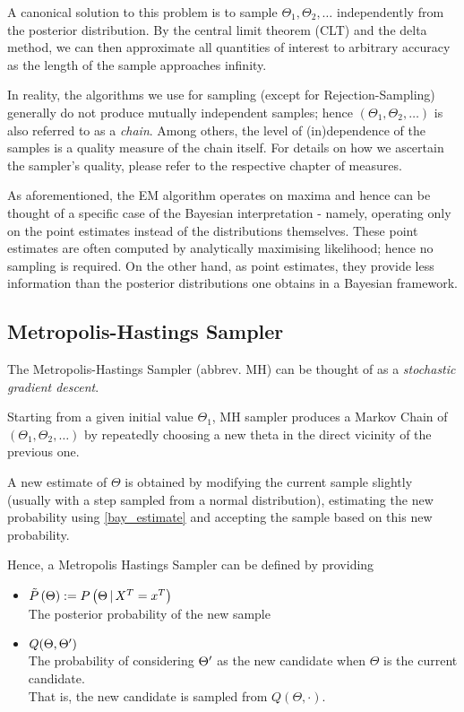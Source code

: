 	A canonical solution to this problem is to sample $\Theta_1, \Theta_2, \dots$ independently from the posterior distribution. By the central limit theorem (CLT) and the delta method, we can then approximate all quantities of interest to arbitrary accuracy as the length of the sample approaches infinity. 
	
	In reality, the algorithms we use for sampling (except for Rejection-Sampling) generally do not produce mutually independent samples; hence $\left(\Theta_1, \Theta_2, \dots \right)$ is also referred to as a \textit{chain}. Among others, the level of (in)dependence of the samples is a quality measure of the chain itself. For details on how we ascertain the sampler's quality, please refer to the respective chapter of measures.   
	
	
	As aforementioned, the EM algorithm operates on maxima and hence can be thought of a specific case of the Bayesian interpretation - namely, operating only on the point estimates instead of the distributions themselves. These point estimates are often computed by analytically maximising likelihood; hence no sampling is required. On the other hand, as point estimates, they provide less information than the posterior distributions one obtains in a Bayesian framework. 
	
	

	\subsection{Metropolis-Hastings Sampler}
	\label{chap_mh_sampler}
	The Metropolis-Hastings Sampler (abbrev. MH) can be thought of as a \textit{stochastic gradient descent}. 
	
	Starting from a given initial value $\Theta_1$,  MH sampler produces a Markov Chain of $\left(\Theta_1, \Theta_2, \dots \right)$ by repeatedly choosing a new theta in the direct vicinity of the previous one. 
	
	A new estimate of $\Theta$ is obtained by modifying the current sample slightly (usually with a step sampled from a normal distribution), estimating the new probability using \ref{bay_estimate} and accepting the sample based on this new probability. 
	
	Hence, a Metropolis Hastings Sampler can be defined by providing
	\begin{itemize}
		\item $\tilde{P}\left(\Theta\right) := P\left(\Theta \, | \, X^T = x^T\right)$\\
			  The posterior probability of the new sample 
		\item $Q(\Theta, \Theta^\prime)$ \\
			  The probability of considering $\Theta^\prime$ as the new candidate when $\Theta$ is the current candidate. \\
			  That is, the new candidate is sampled from $Q(\Theta, \cdot)$. 
	\end{itemize}
	
